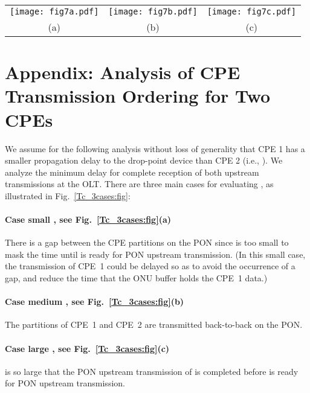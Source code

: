 \documentclass[pdftex,journal]{IEEEtran}
\begin{document}
\vspace{\baselineskip}

\begin{figure*}[t]
\centering
\begin{tabular}{ccc}
\texttt{[image: fig7a.pdf]}
&  \texttt{[image: fig7b.pdf]} &
\texttt{[image: fig7c.pdf]} \\
\scriptsize{(a) }  &
   \scriptsize{(b) }  &
      \scriptsize{(c) }
\end{tabular}
\caption{Illustration of cases for analysis of minimum completion time
for two CPEs (CPE 1 and CPE 2) with segregate sub-windows in the PON grant.
This illustration shows the round-trip propagation delays
 on the DSL networks as well as the
DSL upstream transmission delays  and .
The PON upstream transmission delays 
and   can be masked by the DSL upstream transmissions
and influence when the PON upstream transmissions can commence.
The PON upstream transmission delays  occur
after the DSL upstream transmission is complete.
}
\label{Tc_3cases:fig}
\end{figure*}
\section*{Appendix: Analysis of CPE Transmission Ordering for Two CPEs}
We assume for the following analysis without loss of
generality that CPE 1 has a smaller propagation delay to
the drop-point device than CPE 2 (i.e., ).
We analyze the minimum delay  for complete reception of both
upstream transmissions at the OLT.
There are three main cases for evaluating ,
as illustrated in Fig.~\ref{Tc_3cases:fig}:
\paragraph{Case small , see Fig.~\ref{Tc_3cases:fig}(a)}
There is a gap between the CPE partitions on the PON since
 is too small to mask the time until  is ready for PON
upstream transmission.
(In this small  case, the transmission
of CPE~1 could be delayed so as to avoid the occurrence of a gap,
and reduce the time that the ONU buffer holds the CPE~1 data.)
\paragraph{Case medium , see Fig.~\ref{Tc_3cases:fig}(b)}
The partitions of CPE~1 and CPE~2 are transmitted back-to-back on the PON.
\paragraph{Case large , see Fig.~\ref{Tc_3cases:fig}(c)}
 is so large that the PON upstream transmission of 
is completed before  is ready for PON upstream transmission.
\end{document}
